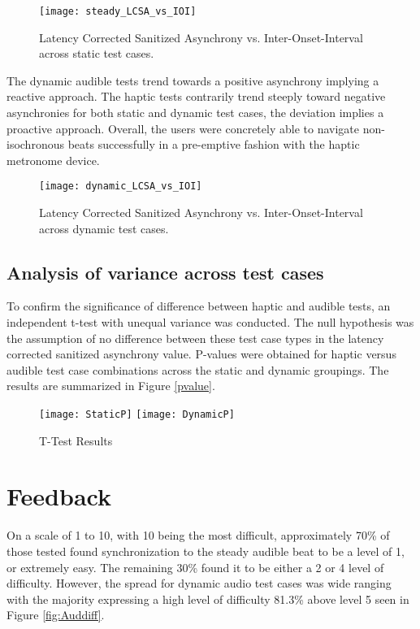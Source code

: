 \begin{figure}[H]
    \centering
    \texttt{[image: steady\_LCSA\_vs\_IOI]}
    \caption{Latency Corrected Sanitized Asynchrony vs. Inter-Onset-Interval across static test cases.}
    \label{fig:sLCSAvIOI}
\end{figure}

The dynamic audible tests trend towards a positive asynchrony implying a reactive approach. The haptic tests contrarily trend steeply toward negative asynchronies for both static and dynamic test cases, the deviation implies a proactive approach. Overall, the users were concretely able to navigate non-isochronous beats successfully in a pre-emptive fashion with the haptic metronome device. 
\begin{figure}[H]
    \centering
    \texttt{[image: dynamic\_LCSA\_vs\_IOI]}
    \caption{Latency Corrected Sanitized Asynchrony vs. Inter-Onset-Interval across dynamic test cases.}
    \label{fig:dLCSAvIOI}
\end{figure}

\subsection{Analysis of variance across test cases}

To confirm the significance of difference between haptic and audible tests, an independent t-test with unequal variance was conducted. The null hypothesis was the assumption of no difference between these test case types in the latency corrected sanitized asynchrony value. P-values were obtained for haptic versus audible test case combinations across the static and dynamic groupings. The results are summarized in Figure \ref{pvalue}.

\begin{figure}[H]
    \centering
    \texttt{[image: StaticP]}
    \texttt{[image: DynamicP]}
    \caption{T-Test Results}
    \label{fig:pvalue}
\end{figure}

\section{Feedback}
On a scale of 1 to 10, with 10 being the most difficult, approximately 70\% of those tested found synchronization to the steady audible beat to be a level of 1, or extremely easy. The remaining 30\% found it to be either a 2 or 4 level of difficulty. However, the spread for dynamic audio test cases was wide ranging with the majority expressing a high level of difficulty 81.3\% above level 5 seen in Figure \ref{fig:Auddiff}.

